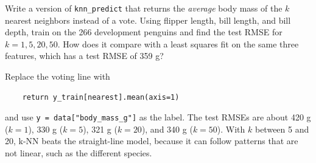 \begin{Exercise}[label=knn5, title={Nearest-neighbor regression}]
Write a version of \verb|knn_predict| that returns the \emph{average} body mass of the $k$ nearest neighbors
instead of a vote. Using flipper length, bill length, and bill depth, train on the 266 development penguins and
find the test RMSE for $k = 1, 5, 20, 50$. How does it compare with a least squares fit on the same three
features, which has a test RMSE of 359 g?
\end{Exercise}
\begin{Answer}[ref=knn5]
Replace the voting line with
\begin{verbatim}
    return y_train[nearest].mean(axis=1)
\end{verbatim}
and use \verb|y = data["body_mass_g"]| as the label. The test RMSEs are about 420 g ($k = 1$), 330 g ($k = 5$), 321 g ($k = 20$),
and 340 g ($k = 50$). With $k$ between 5 and 20, k-NN beats the straight-line model, because it can follow
patterns that are not linear, such as the different species.
\end{Answer}
